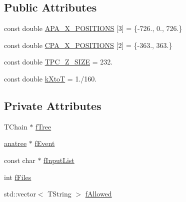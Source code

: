 \subsection*{Public Attributes}
\begin{DoxyCompactItemize}
\item 
const double \hyperlink{classcalib_1_1EventProcessor_a647db8f90d566862aa03b46ffde8c631}{A\-P\-A\-\_\-\-X\-\_\-\-P\-O\-S\-I\-T\-I\-O\-N\-S} \mbox{[}3\mbox{]} = \{-\/726., 0., 726.\}
\item 
const double \hyperlink{classcalib_1_1EventProcessor_a544483b159bec0f16ee91ad5e2a067d7}{C\-P\-A\-\_\-\-X\-\_\-\-P\-O\-S\-I\-T\-I\-O\-N\-S} \mbox{[}2\mbox{]} = \{-\/363., 363.\}
\item 
const double \hyperlink{classcalib_1_1EventProcessor_a5d575b3b15c62a4c48b7e407847db92c}{T\-P\-C\-\_\-\-Z\-\_\-\-S\-I\-Z\-E} = 232.
\item 
const double \hyperlink{classcalib_1_1EventProcessor_a562211bed340e1e30cb8abe3d50b5000}{k\-Xto\-T} = 1./160.
\end{DoxyCompactItemize}
\subsection*{Private Attributes}
\begin{DoxyCompactItemize}
\item 
T\-Chain $\ast$ \hyperlink{classcalib_1_1EventProcessor_acc413ddc053b0c1fa4dd9af5dfdd01bd}{f\-Tree}
\item 
\hyperlink{classanatree}{anatree} $\ast$ \hyperlink{classcalib_1_1EventProcessor_ade8ca632b3c948b7e3c0e3dbf099962e}{f\-Event}
\item 
const char $\ast$ \hyperlink{classcalib_1_1EventProcessor_a705869fbcec218c3a8ccb7ee05bc906e}{f\-Input\-List}
\item 
int \hyperlink{classcalib_1_1EventProcessor_a1756dbab57c215ce307413e8c5cc7bdc}{f\-Files}
\item 
std\-::vector$<$ T\-String $>$ \hyperlink{classcalib_1_1EventProcessor_ab5d81b53d95f813ea48441147c9b7b69}{f\-Allowed}
\end{DoxyCompactItemize}


